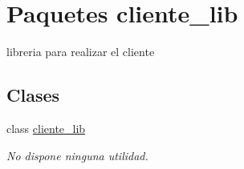 \hypertarget{namespacecliente__lib}{
\section{Paquetes cliente\_\-lib}
\label{namespacecliente__lib}
}


libreria para realizar el cliente  


\subsection*{Clases}
\begin{DoxyCompactItemize}
\item 
class \hyperlink{classcliente__lib_1_1cliente__lib}{cliente\_\-lib}
\begin{DoxyCompactList}\small\item\em No dispone ninguna utilidad. \end{DoxyCompactList}\end{DoxyCompactItemize}
